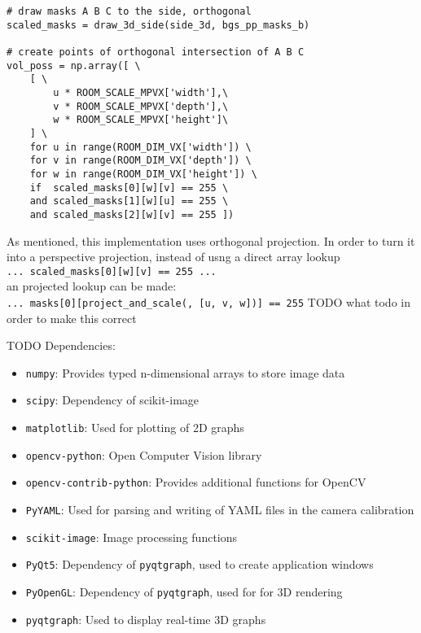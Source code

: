 \begin{lstlisting}[caption={Othorgonal volume intersection implementation}, label={lst:impl:volintersect}]
# draw masks A B C to the side, orthogonal
scaled_masks = draw_3d_side(side_3d, bgs_pp_masks_b)

# create points of orthogonal intersection of A B C
vol_poss = np.array([ \
    [ \
        u * ROOM_SCALE_MPVX['width'],\
        v * ROOM_SCALE_MPVX['depth'],\
        w * ROOM_SCALE_MPVX['height']\
    ] \
    for u in range(ROOM_DIM_VX['width']) \
    for v in range(ROOM_DIM_VX['depth']) \
    for w in range(ROOM_DIM_VX['height']) \
    if  scaled_masks[0][w][v] == 255 \
    and scaled_masks[1][w][u] == 255 \
    and scaled_masks[2][w][v] == 255 ])
\end{lstlisting}

As mentioned, this implementation uses orthogonal projection.
In order to turn it into a perspective projection, instead of usng a direct array lookup \\
\texttt{... scaled_masks[0][w][v] == 255 ...} \\
an projected lookup can be made:\\
\texttt{... masks[0][project_and_scale(, [u, v, w])] == 255}
TODO what todo in order to make this correct


TODO Dependencies:
\begin{itemize}[noitemsep]
    \item \texttt{numpy}:  Provides typed n-dimensional arrays to store image data
    \item \texttt{scipy}:  Dependency of scikit-image
    \item \texttt{matplotlib}: Used for plotting of 2D graphs
    \item \texttt{opencv-python}: Open Computer Vision library
    \item \texttt{opencv-contrib-python}: Provides additional functions for OpenCV
    \item \texttt{PyYAML}: Used for parsing and writing of \ac{YAML} files in the camera calibration
    \item \texttt{scikit-image}: Image processing functions  
    \item \texttt{PyQt5}: Dependency of \texttt{pyqtgraph}, used to create application windows
    \item \texttt{PyOpenGL}: Dependency of \texttt{pyqtgraph}, used for for \ac{3D} rendering 
    \item \texttt{pyqtgraph}: Used to display real-time 3D graphs
\end{itemize}

